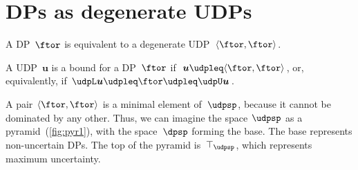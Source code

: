 \section{DPs as degenerate UDPs}

A DP~$\ftor$ is equivalent to a degenerate UDP~$\langle\ftor,\ftor\rangle$.

A UDP~$\boldsymbol{u}$ is a bound for a DP~$\ftor$ if~$\boldsymbol{u}\udpleq\langle\ftor,\ftor\rangle$,
or, equivalently, if $\udpL\boldsymbol{u}\udpleq\ftor\udpleq\udpU\boldsymbol{u}$.


A pair $\langle\ftor,\ftor\rangle$ is a minimal element of~$\udpsp$,
because it cannot be dominated by any other. Thus, we can imagine
the space $\udpsp$ as a pyramid~(\cref{fig:pyr1}), with the
space~$\dpsp$ forming the base. The base represents non-uncertain
DPs. The top of the pyramid is~$\top_{\udpsp}$, which represents
maximum uncertainty.

